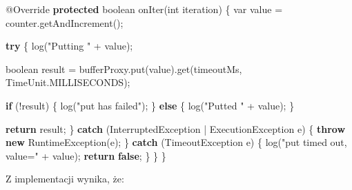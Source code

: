\documentclass[11pt]{article}
\newenvironment{Shaded}{}{}
\newcommand{\KeywordTok}[1]{\textcolor[rgb]{0.00,0.44,0.13}{\textbf{{#1}}}}
\newcommand{\DataTypeTok}[1]{\textcolor[rgb]{0.56,0.13,0.00}{{#1}}}
\newcommand{\StringTok}[1]{\textcolor[rgb]{0.25,0.44,0.63}{{#1}}}
\newcommand{\FunctionTok}[1]{\textcolor[rgb]{0.02,0.16,0.49}{{#1}}}
\newcommand{\NormalTok}[1]{{#1}}
\newcommand{\ControlFlowTok}[1]{\textcolor[rgb]{0.00,0.44,0.13}{\textbf{{#1}}}}
\newcommand{\OperatorTok}[1]{\textcolor[rgb]{0.40,0.40,0.40}{{#1}}}
\newcommand{\BuiltInTok}[1]{{#1}}
\newcommand{\AttributeTok}[1]{\textcolor[rgb]{0.49,0.56,0.16}{{#1}}}
\begin{document}
\begin{Shaded}
\begin{Highlighting}[]
    \AttributeTok{@Override}
    \KeywordTok{protected} \DataTypeTok{boolean} \FunctionTok{onIter}\OperatorTok{(}\DataTypeTok{int}\NormalTok{ iteration}\OperatorTok{)} \OperatorTok{\{}
        \DataTypeTok{var}\NormalTok{ value }\OperatorTok{=}\NormalTok{ counter}\OperatorTok{.}\FunctionTok{getAndIncrement}\OperatorTok{();}

        \ControlFlowTok{try} \OperatorTok{\{}
            \FunctionTok{log}\OperatorTok{(}\StringTok{"Putting "} \OperatorTok{+}\NormalTok{ value}\OperatorTok{);}

            \DataTypeTok{boolean}\NormalTok{ result }\OperatorTok{=}
\NormalTok{                bufferProxy}\OperatorTok{.}\FunctionTok{put}\OperatorTok{(}\NormalTok{value}\OperatorTok{).}\FunctionTok{get}\OperatorTok{(}\NormalTok{timeoutMs}\OperatorTok{,} \BuiltInTok{TimeUnit}\OperatorTok{.}\FunctionTok{MILLISECONDS}\OperatorTok{);}

            \ControlFlowTok{if} \OperatorTok{(!}\NormalTok{result}\OperatorTok{)} \OperatorTok{\{}
                \FunctionTok{log}\OperatorTok{(}\StringTok{"put has failed"}\OperatorTok{);}
            \OperatorTok{\}} \ControlFlowTok{else} \OperatorTok{\{}
                \FunctionTok{log}\OperatorTok{(}\StringTok{"Putted "} \OperatorTok{+}\NormalTok{ value}\OperatorTok{);}
            \OperatorTok{\}}

            \ControlFlowTok{return}\NormalTok{ result}\OperatorTok{;}
        \OperatorTok{\}} \ControlFlowTok{catch} \OperatorTok{(}\BuiltInTok{InterruptedException} \OperatorTok{|} \BuiltInTok{ExecutionException}\NormalTok{ e}\OperatorTok{)} \OperatorTok{\{}
            \ControlFlowTok{throw} \KeywordTok{new} \BuiltInTok{RuntimeException}\OperatorTok{(}\NormalTok{e}\OperatorTok{);}
        \OperatorTok{\}} \ControlFlowTok{catch} \OperatorTok{(}\BuiltInTok{TimeoutException}\NormalTok{ e}\OperatorTok{)} \OperatorTok{\{}
            \FunctionTok{log}\OperatorTok{(}\StringTok{"put timed out, value="} \OperatorTok{+}\NormalTok{ value}\OperatorTok{);}
            \ControlFlowTok{return} \KeywordTok{false}\OperatorTok{;}
        \OperatorTok{\}}
    \OperatorTok{\}}
\OperatorTok{\}}
\end{Highlighting}
\end{Shaded}

Z implementacji wynika, że:
\end{document}
